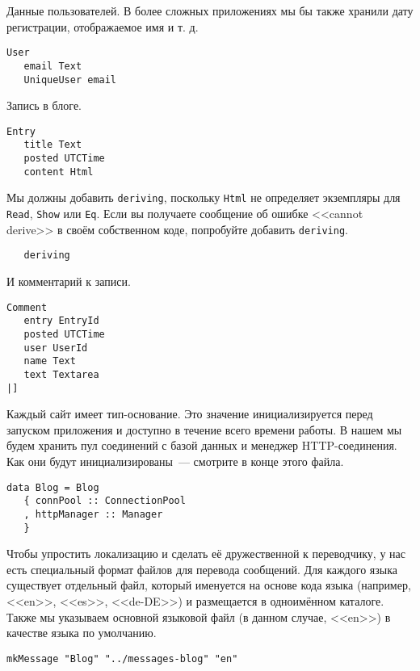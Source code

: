 Данные пользователей. В более сложных приложениях мы бы также хранили дату регистрации, отображаемое имя и т. д.
 
\begin{lstlisting}
User
   email Text
   UniqueUser email
\end{lstlisting}
 
Запись в блоге. 
 
\begin{lstlisting}
Entry
   title Text
   posted UTCTime
   content Html
\end{lstlisting}
 
Мы должны добавить \lstinline!deriving!, поскольку \lstinline!Html! не определяет экземпляры для \lstinline!Read!, \lstinline!Show! или \lstinline!Eq!. Если вы получаете сообщение об ошибке <<cannot derive>> в своём собственном коде, попробуйте добавить \lstinline!deriving!.
 
\begin{lstlisting}
   deriving
\end{lstlisting}
 
И комментарий к записи.
 
\begin{lstlisting}
Comment
   entry EntryId
   posted UTCTime
   user UserId
   name Text
   text Textarea
|]
\end{lstlisting}
 
Каждый сайт имеет тип-основание. Это значение инициализируется перед запуском приложения и доступно в течение всего времени работы. В нашем мы будем хранить пул соединений с базой данных и менеджер HTTP-соединения. Как они будут инициализированы~--- смотрите в конце этого файла.
 
\begin{lstlisting}
data Blog = Blog
   { connPool :: ConnectionPool
   , httpManager :: Manager
   }
\end{lstlisting}
 
Чтобы упростить локализацию и сделать её дружественной к переводчику, у нас есть специальный формат файлов для перевода сообщений. Для каждого языка существует отдельный файл, который именуется на основе кода языка (например, <<en>>, <<es>>, <<de-DE>>) и размещается в одноимённом каталоге. Также мы указываем основной языковой файл (в данном случае, <<en>>) в качестве языка по умолчанию.
 
\begin{lstlisting}
mkMessage "Blog" "../messages-blog" "en"
\end{lstlisting}
 

